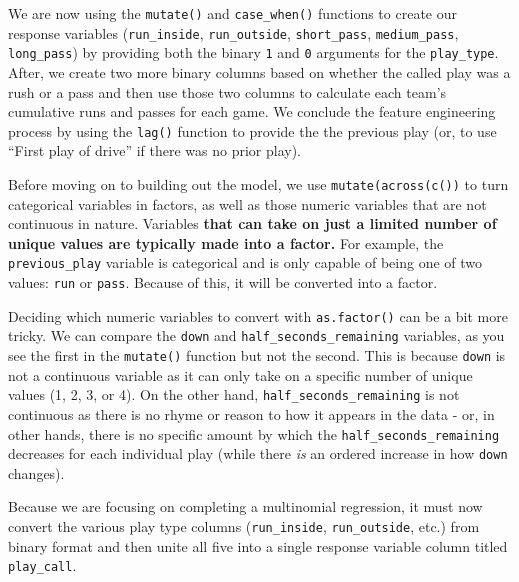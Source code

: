 \documentclass[
  letterpaper,
]{krantz}
\begin{document}
We are now using the \texttt{mutate()} and \texttt{case\_when()}
functions to create our response variables (\texttt{run\_inside},
\texttt{run\_outside}, \texttt{short\_pass}, \texttt{medium\_pass},
\texttt{long\_pass}) by providing both the binary \texttt{1} and
\texttt{0} arguments for the \texttt{play\_type}. After, we create two
more binary columns based on whether the called play was a rush or a
pass and then use those two columns to calculate each team's cumulative
runs and passes for each game. We conclude the feature engineering
process by using the \texttt{lag()} function to provide the the previous
play (or, to use ``First play of drive'' if there was no prior play).

Before moving on to building out the model, we use
\texttt{mutate(across(c())} to turn categorical variables in factors, as
well as those numeric variables that are not continuous in nature.
Variables \textbf{that can take on just a limited number of unique
values are typically made into a factor.} For example, the
\texttt{previous\_play} variable is categorical and is only capable of
being one of two values: \texttt{run} or \texttt{pass}. Because of this,
it will be converted into a factor.

Deciding which numeric variables to convert with \texttt{as.factor()}
can be a bit more tricky. We can compare the \texttt{down} and
\texttt{half\_seconds\_remaining} variables, as you see the first in the
\texttt{mutate()} function but not the second. This is because
\texttt{down} is not a continuous variable as it can only take on a
specific number of unique values (1, 2, 3, or 4). On the other hand,
\texttt{half\_seconds\_remaining} is not continuous as there is no rhyme
or reason to how it appears in the data - or, in other hands, there is
no specific amount by which the \texttt{half\_seconds\_remaining}
decreases for each individual play (while there \emph{is} an ordered
increase in how \texttt{down} changes).

Because we are focusing on completing a multinomial regression, it must
now convert the various play type columns (\texttt{run\_inside},
\texttt{run\_outside}, etc.) from binary format and then unite all five
into a single response variable column titled \texttt{play\_call}.
\end{document}
